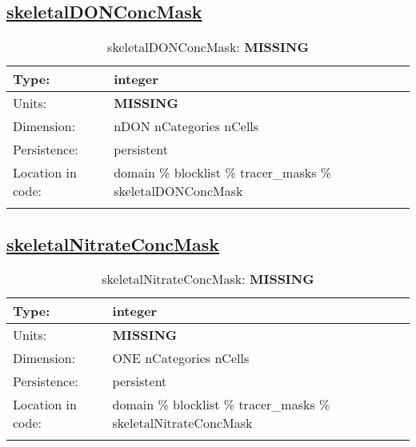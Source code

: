 \subsection[skeletalDONConcMask]{\hyperref[sec:var_tab_tracer_masks]{skeletalDONConcMask}}
\label{subsec:var_sec_tracer_masks_skeletalDONConcMask}
\begin{center}
\begin{longtable}{| p{2.0in} | p{4.0in} |}
        \hline 
        Type: & integer \\
        \hline 
        Units: & {\bf \color{red} MISSING} \\
        \hline 
        Dimension: & nDON nCategories nCells \\
        \hline 
        Persistence: & persistent \\
        \hline 
         Location in code: & domain \% blocklist \% tracer\_masks \% skeletalDONConcMask \\
         \hline 
    \caption{skeletalDONConcMask: {\bf \color{red} MISSING}}
\end{longtable}
\end{center}
\subsection[skeletalNitrateConcMask]{\hyperref[sec:var_tab_tracer_masks]{skeletalNitrateConcMask}}
\label{subsec:var_sec_tracer_masks_skeletalNitrateConcMask}
\begin{center}
\begin{longtable}{| p{2.0in} | p{4.0in} |}
        \hline 
        Type: & integer \\
        \hline 
        Units: & {\bf \color{red} MISSING} \\
        \hline 
        Dimension: & ONE nCategories nCells \\
        \hline 
        Persistence: & persistent \\
        \hline 
         Location in code: & domain \% blocklist \% tracer\_masks \% skeletalNitrateConcMask \\
         \hline 
    \caption{skeletalNitrateConcMask: {\bf \color{red} MISSING}}
\end{longtable}
\end{center}
